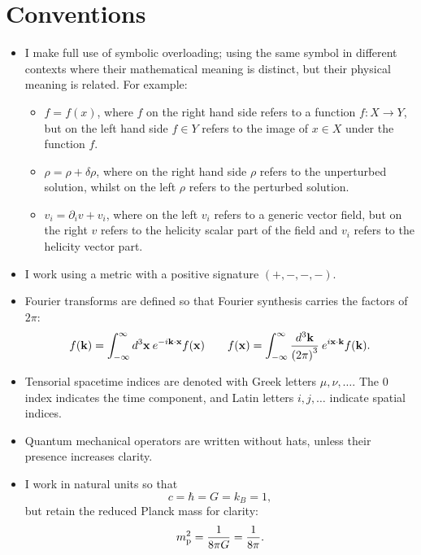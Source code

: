\chapter*{Conventions}
\label{sec:cos:conventions}


\begin{itemize}
  \item I make full use of symbolic overloading; using the same symbol in different contexts where their mathematical meaning is distinct, but their physical meaning is related. For example:
    \begin{itemize}
      \item $f=f(x)$, where $f$ on the right hand side refers to a function ${f:X\to Y}$, but on the left hand side $f\in Y$ refers to the image of $x\in X$ under the function $f$.
      \item $\rho = \rho + \delta\rho$, where on the right hand side $\rho$ refers to the unperturbed solution, whilst on the left $\rho$ refers to the perturbed solution.
      \item $v_i = \partial_i v + v_i$, where on the left $v_i$ refers to a generic vector field, but on the right $v$ refers to the helicity scalar part of the field and $v_i$ refers to the helicity vector part.
    \end{itemize}
  \item I work using a metric with a positive signature $(+,-,-,-)$.
  \item Fourier transforms are defined so that Fourier synthesis carries the factors of $2\pi$:
    \begin{equation}
      f(\mathbf{k}) = \int_{-\infty}^{\infty} d^3\mathbf{x}\: e^{-i \mathbf{k}\cdot\mathbf{x}} f(\mathbf{x}) \qquad f(\mathbf{x}) = \int_{-\infty}^{\infty} \frac{d^3\mathbf{k}}{{(2\pi)}^3}\: e^{i \mathbf{x}\cdot\mathbf{k}} f(\mathbf{k}).
      \label{eqn:cos:fourier_transform}
    \end{equation}
  \item Tensorial spacetime indices are denoted with Greek letters $\mu,\nu,\ldots$. The $0$ index indicates the time component, and Latin letters $i,j,\ldots$ indicate spatial indices.
  \item Quantum mechanical operators are written without hats, unless their presence increases clarity.
  \item I work in natural units so that 
    \begin{equation}
      c = \hbar = G = k_B = 1,
      \label{eqn:cos:natural_units}
    \end{equation}
    but retain the reduced Planck mass for clarity:
    \begin{equation}
      m_{\mathrm{p}}^2 = \frac{1}{8\pi G} = \frac{1}{8\pi}.
      \label{eqn:cos:reduced_planck_mass}
    \end{equation}
\end{itemize}

\cleardoublepage{}
